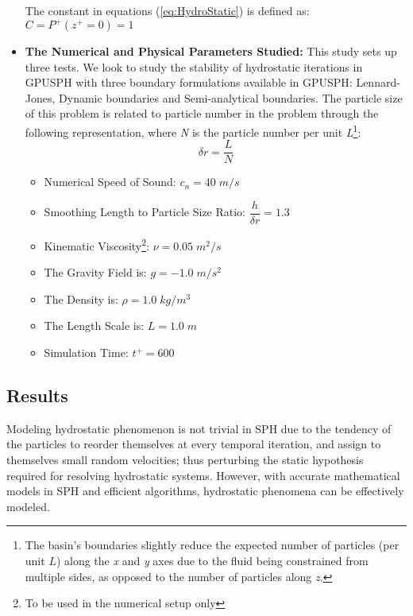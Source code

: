\documentclass{../GPUSPHtemplate}
\begin{document}
\begin{itemize}
  The constant in equations (\ref{eq:HydroStatic}) is defined as:\\
  $C = P^+(z^+ = 0) = 1$
  
\item \textbf{The Numerical and Physical Parameters Studied:} This study sets up three tests.
  We look to study the stability of hydrostatic iterations in GPUSPH with three boundary formulations available in GPUSPH:
  Lennard-Jones, Dynamic boundaries and Semi-analytical boundaries.
  The particle size of this problem is related to particle number in the problem through the following representation,
  where \textit{N} is the particle number per unit
  \textit{L}\footnote{The basin's boundaries slightly reduce the expected number of particles (per unit $L$)
    along the \textit{x} and \textit{y} axes due to the fluid being constrained from multiple sides,
    as opposed to the number of particles along \textit{z}. }:
  \begin{equation}
    \delta r = \frac{L}{N} 
  \end{equation}            
  
  \begin{itemize}
  \item Numerical Speed of Sound: ${c_n} = 40 \; m/s$
  \item Smoothing Length to Particle Size Ratio: $\dfrac{h}{\delta r}=1.3$ 
  \item Kinematic Viscosity\footnote{To be used in the numerical setup only}: $\nu = 0.05 \; {m^2}/{s}$
  \item The Gravity Field is: $g = -1.0 \; {m}/{s^2}$
  \item The Density is: $\rho = 1.0 \; {kg}/{m^3} $
  \item The Length Scale is: $L = 1.0 \; m$
  \item Simulation Time: $t^+ = 600 $ 
  \end{itemize}
  
\end{itemize}

\subsection{Results}
Modeling hydrostatic phenomenon is not trivial in SPH due to the tendency of the particles
to reorder themselves at every temporal iteration, and assign to themselves small random velocities;
thus perturbing the static hypothesis required for resolving hydrostatic systems. However, with accurate
mathematical models in SPH and efficient algorithms, hydrostatic phenomena can be effectively modeled.\\
\end{document}
